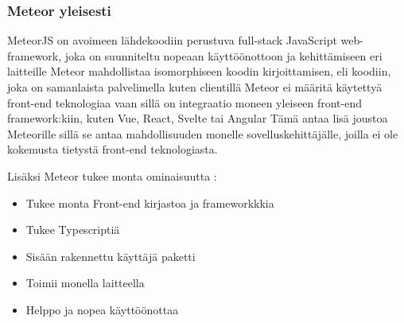 



\subsubsection{Meteor yleisesti}








MeteorJS on avoimeen lähdekoodiin perustuva full-stack JavaScript web-framework, joka on 
suunniteltu nopeaan käyttöönottoon ja kehittämiseen eri laitteille 
Meteor mahdollistaa isomorphiseen koodin kirjoittamisen, eli koodiin, joka on samanlaista palvelimella kuten clientillä %
Meteor ei määritä käytettyä front-end teknologiaa vaan sillä on integraatio moneen yleiseen front-end framework:kiin, kuten Vue, React, Svelte tai Angular 
Tämä antaa lisä joustoa Meteorille sillä se antaa mahdollisuuden monelle sovelluskehittäjälle, joilla ei ole kokemusta tietystä front-end teknologiasta.\\
\medskip



    

Lisäksi Meteor tukee monta ominaisuutta :
\begin{itemize}
    \item Tukee monta Front-end kirjastoa ja frameworkkkia
    \item Tukee Typescriptiä
    \item Sisään rakennettu käyttäjä paketti
    \item Toimii monella laitteella
    \item Helppo ja nopea käyttöönottaa 
\end{itemize}
\medskip



